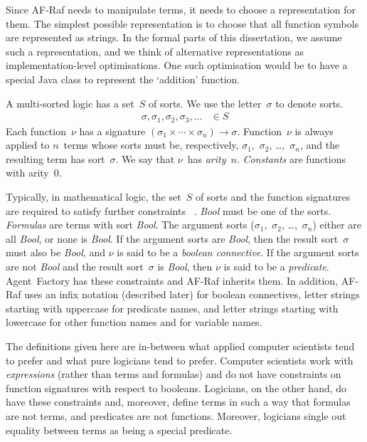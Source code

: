 \documentclass[a4paper,12pt,oneside,fleqn]{book} %
\newcommand{\rg}[1]{\marginpar{\tiny\raggedright\textcolor{blue}{\bf rg:} #1}}
\renewcommand{\rg}{}
\begin{document}
\begin{remark}
Since AF-Raf needs to manipulate terms,
  it needs to choose a representation for them.
The simplest possible representation
  is to choose that all function symbols are represented as strings.
In the formal parts of this dissertation,
  we assume such a representation,
  and we think of alternative representations
    as implementation-level optimisations.
One such optimisation would be to have a special Java class
  to represent the `addition' function.
\end{remark}

A multi-sorted logic has a set~$S$ of sorts.  We use the letter~$\sigma$ to
denote sorts.
\begin{align}
\sigma, \sigma_1, \sigma_2, \sigma_3, \ldots &\in S
\end{align}
Each function~$\nu$ has a signature
$(\sigma_1\times\cdots\times\sigma_n)\to\sigma$.  Function~$\nu$ is always
applied to $n$~terms whose sorts must be, respectively,
$\sigma_1$,~$\sigma_2$, \dots,~$\sigma_n$, and the resulting term has
sort~$\sigma$. We say that $\nu$~has \emph{arity}~$n$. \emph{Constants} are
functions with arity~$0$.

Typically, in mathematical logic, the set~$S$ of sorts and the function
signatures are required to satisfy further constraints~%
  \cite{shoenfield1967}.
\textit{Bool} must
be one of the sorts. \emph{Formulas} are terms with sort \textit{Bool}.
The argument sorts ($\sigma_1$,~$\sigma_2$, \dots,~$\sigma_n$) either are
all \textit{Bool}, or none is \textit{Bool}.  If the argument sorts are
\textit{Bool}, then the result sort~$\sigma$ must also be \textit{Bool},
and $\nu$ is said to be a \emph{boolean connective}.  If the argument sorts
are not \textit{Bool} and the result sort~$\sigma$ is \textit{Bool}, then
$\nu$ is said to be a \emph{predicate}.  Agent~Factory has these
constraints and AF-Raf inherits them. In addition, AF-Raf uses an infix
notation (described later) for boolean connectives, letter strings starting
with uppercase for predicate names, and letter strings starting with
lowercase for other function names and for variable names.

\begin{remark}
The definitions given here are in-between what applied computer scientists
tend to prefer and what pure logicians tend to prefer.  Computer scientists
work with \emph{expressions} (rather than terms and formulas) and do not
have constraints on function signatures with respect to booleans.
Logicians, on the other hand, do have these constraints and, moreover,
define terms in such a way that formulas are not terms, and predicates are
not functions. Moreover, logicians single out equality between terms as
being a special predicate.
\end{remark}
\end{document}
